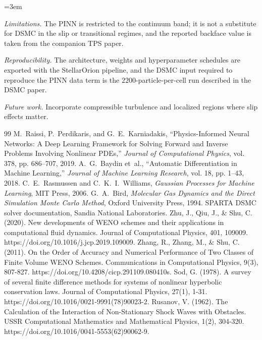 \documentclass[conference]{IEEEtran}
\begin{document}
\begin{sloppypar} \emergencystretch=3em \raggedright
\noindent\textit{Limitations.} The PINN is restricted to the continuum band; it is not a substitute for DSMC in the slip or transitional regimes, and the reported backface value is taken from the companion TPS paper.\par\vspace{0.3em}
\noindent\textit{Reproducibility.} The architecture, weights and hyperparameter schedules are exported with the StellarOrion pipeline, and the DSMC input required to reproduce the PINN data term is the $2200$-particle-per-cell run described in the DSMC paper.\par\vspace{0.5em}
\noindent\textit{Future work.} Incorporate compressible turbulence and localized regions where slip effects matter.\par\vspace{0.3em}
\begin{thebibliography}{99}
 M.~Raissi, P.~Perdikaris, and G.~E.~Karniadakis, ``Physics-Informed Neural Networks: A Deep Learning Framework for Solving Forward and Inverse Problems Involving Nonlinear PDEs,'' \emph{Journal of Computational Physics}, vol. 378, pp. 686--707, 2019.
 A.~G.~Baydin et~al., ``Automatic Differentiation in Machine Learning,'' \emph{Journal of Machine Learning Research}, vol. 18, pp. 1--43, 2018.
 C.~E.~Rasmussen and C.~K.~I.~Williams, \emph{Gaussian Processes for Machine Learning}, MIT Press, 2006.
 G.~A.~Bird, \emph{Molecular Gas Dynamics and the Direct Simulation Monte Carlo Method}, Oxford University Press, 1994.
 SPARTA DSMC solver documentation, Sandia National Laboratories.
 Zhu, J., Qiu, J., \& Shu, C. (2020). New developments of WENO schemes and their applications in computational fluid dynamics. Journal of Computational Physics, 401, 109009. https://doi.org/10.1016/j.jcp.2019.109009.
 Zhang, R., Zhang, M., \& Shu, C. (2011). On the Order of Accuracy and Numerical Performance of Two Classes of Finite Volume WENO Schemes. Communications in Computational Physics, 9(3), 807-827. https://doi.org/10.4208/cicp.291109.080410s.
 Sod, G. (1978). A survey of several finite difference methods for systems of nonlinear hyperbolic conservation laws. Journal of Computational Physics, 27(1), 1-31. https://doi.org/10.1016/0021-9991(78)90023-2.
 Rusanov, V. (1962). The Calculation of the Interaction of Non-Stationary Shock Waves with Obstacles. USSR Computational Mathematics and Mathematical Physics, 1(2), 304-320. https://doi.org/10.1016/0041-5553(62)90062-9.

\end{thebibliography}
\end{sloppypar}
\end{document}
